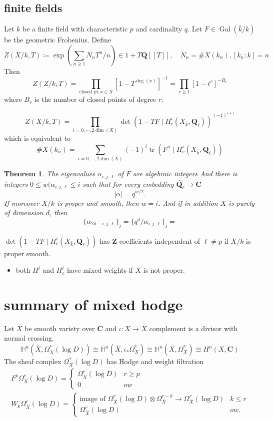\documentclass[leqno]{amsart}
\DeclareMathOperator{\mtr}{tr}
\newcommand{\Q}{{\mathbf{Q}}}
\newcommand{\Z}{{\mathbf{Z}}}
\newcommand{\Ql}{\mathbf{Q}_\ell}
\newcommand{\C}{\mathbf C}
\DeclareMathOperator{\Gal}{Gal}
\newcommand{\1}{\mathbf{1}}
\newtheorem{thm}{Theorem}[section]
\theoremstyle{definition}
\theoremstyle{remark}
\begin{document}
\subsection{finite fields}
Let $k$ be a finite field with
characteristic  $p$ and
cardinality  $q$.
Let  $F\in \Gal(\bar{k}/k)$ be the geometric Frobenius.
Define
\[
	Z(X/k,T)\coloneqq
	\exp\left( \sum_{n\geq 1}N_nT^n/n \right)\in
	1+T\Q[[T]],\quad
	N_n=\#X(k_n), [k_n:k]=n
\]
Then 
\[
	Z(Z/k,T)=\prod_{\text{closed pt }x\in X}
	[1-T^{\deg(x)}]^{-1}
	=\prod_{r\geq1}[1-t^r]^{-B_r}
\]
where $B_r$ is the number of closed points
of degree  $r$.

\[
	Z(X/k,T)=
	\prod_{i=0,\cdots,2\dim(X)}
	\det(1-TF\mid H^i_c(X_{\bar{k}},\Ql))^{(-1)^{i+1}}
\]
which is equivalent to 
\[
	\#X(k_n)=
	\sum_{i=0,\cdots,2\dim(X)}
	(-1)^i\mtr(F^n\mid H^i_c(X_{\bar{k}},\Ql))
\]

\begin{thm}
	The eigenvalues $\alpha_{i,j,\ell}$
	of $F$ are algebraic integers
	And there is integers
	$0\leq w(\alpha_{i,j,\ell}\leq i$
	such that for every embedding $ \bar{\Q}_\ell\to \C$
	\[
		|\alpha|=q^{w/2}.
	\]
	If moreover $X/k$ is proper and smooth,
	then  $w=i$.
	And if in addition  $X$ is purely of dimension  $d$,
	then
	 \[
		\{\alpha_{2d-i,j,\ell}\}_j=
		\{q^d/\alpha_{i,j,\ell}\}_j=
	\]
\end{thm}
$ \det(1-TF\mid H^i_c(X_{\bar{k}},\Ql))$
has $\Z$-coefficients independent of  $\ell\neq p$
if  $X/k$ is proper smooth.

\begin{itemize}
	\item both $H^i$ and  $H^i_c$ have mixed weights
		if  $X$ is not proper.
\end{itemize}

\section{summary of mixed hodge}

Let $X$ be smooth variety over  $\C$
and  $\iota\colon X\to \bar{X}$
complement is  a divisor with normal crossing.
\[
	\mathbb{H}^n(\bar{X},\Omega^*_{\bar{X}}(\log D))\cong
	\mathbb{H}^n(\bar{X},\iota_*\Omega^*_{X})\cong
	\mathbb{H}^n(X,\Omega^*_{X})\cong
	H^n(X,\C)
\]
The sheaf complex $\Omega^*_{\bar{X}}(\log D)$
has Hodge and weight filtration
\begin{align*}
	F^p\Omega^r_{\bar{X}}(\log D)=
	\begin{cases}
		\Omega^r_{\bar{X}}(\log D) & r\geq p\\
		0 & ow
	\end{cases}\\
	W_k\Omega^r_{\bar{X}}(\log D)=
	\begin{cases}
		\text{image of }
		\Omega^r_{\bar{X}}(\log D)\otimes
		\Omega^{r-k}_{\bar{X}}\to
		\Omega^r_{\bar{X}}(\log D) & k\leq r\\
		\Omega^r_{\bar{X}}(\log D) & ow.
	\end{cases}
\end{align*}
\end{document}
